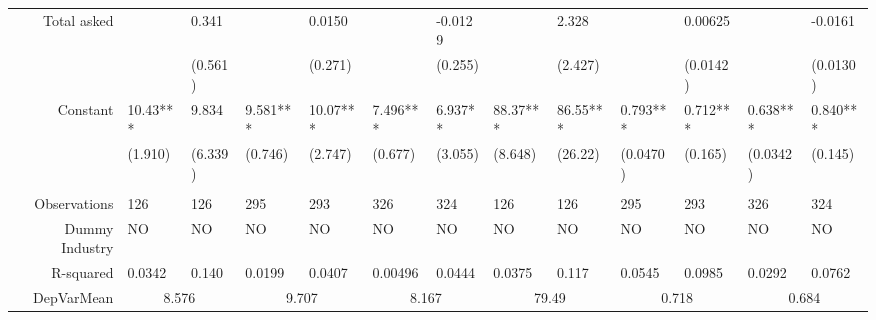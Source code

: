 \begin{tabular}{rrrrrrrrrrrrr}
Total asked & \multicolumn{1}{l}{} & \multicolumn{1}{l}{0.341} & \multicolumn{1}{l}{} & \multicolumn{1}{l}{0.0150} & \multicolumn{1}{l}{} & \multicolumn{1}{l}{-0.0129} & \multicolumn{1}{l}{} & \multicolumn{1}{l}{2.328} & \multicolumn{1}{l}{} & \multicolumn{1}{l}{0.00625} & \multicolumn{1}{l}{} & \multicolumn{1}{l}{-0.0161} \\
      & \multicolumn{1}{l}{} & \multicolumn{1}{l}{(0.561)} & \multicolumn{1}{l}{} & \multicolumn{1}{l}{(0.271)} & \multicolumn{1}{l}{} & \multicolumn{1}{l}{(0.255)} & \multicolumn{1}{l}{} & \multicolumn{1}{l}{(2.427)} & \multicolumn{1}{l}{} & \multicolumn{1}{l}{(0.0142)} & \multicolumn{1}{l}{} & \multicolumn{1}{l}{(0.0130)} \\
Constant & \multicolumn{1}{l}{10.43***} & \multicolumn{1}{l}{9.834} & \multicolumn{1}{l}{9.581***} & \multicolumn{1}{l}{10.07***} & \multicolumn{1}{l}{7.496***} & \multicolumn{1}{l}{6.937**} & \multicolumn{1}{l}{88.37***} & \multicolumn{1}{l}{86.55***} & \multicolumn{1}{l}{0.793***} & \multicolumn{1}{l}{0.712***} & \multicolumn{1}{l}{0.638***} & \multicolumn{1}{l}{0.840***} \\
      & \multicolumn{1}{l}{(1.910)} & \multicolumn{1}{l}{(6.339)} & \multicolumn{1}{l}{(0.746)} & \multicolumn{1}{l}{(2.747)} & \multicolumn{1}{l}{(0.677)} & \multicolumn{1}{l}{(3.055)} & \multicolumn{1}{l}{(8.648)} & \multicolumn{1}{l}{(26.22)} & \multicolumn{1}{l}{(0.0470)} & \multicolumn{1}{l}{(0.165)} & \multicolumn{1}{l}{(0.0342)} & \multicolumn{1}{l}{(0.145)} \\
      & \multicolumn{1}{l}{} & \multicolumn{1}{l}{} & \multicolumn{1}{l}{} & \multicolumn{1}{l}{} & \multicolumn{1}{l}{} & \multicolumn{1}{l}{} & \multicolumn{1}{l}{} & \multicolumn{1}{l}{} & \multicolumn{1}{l}{} & \multicolumn{1}{l}{} & \multicolumn{1}{l}{} & \multicolumn{1}{l}{} \\
      \midrule
Observations & \multicolumn{1}{l}{126} & \multicolumn{1}{l}{126} & \multicolumn{1}{l}{295} & \multicolumn{1}{l}{293} & \multicolumn{1}{l}{326} & \multicolumn{1}{l}{324} & \multicolumn{1}{l}{126} & \multicolumn{1}{l}{126} & \multicolumn{1}{l}{295} & \multicolumn{1}{l}{293} & \multicolumn{1}{l}{326} & \multicolumn{1}{l}{324} \\
Dummy Industry & \multicolumn{1}{l}{NO} & \multicolumn{1}{l}{NO} & \multicolumn{1}{l}{NO} & \multicolumn{1}{l}{NO} & \multicolumn{1}{l}{NO} & \multicolumn{1}{l}{NO} & \multicolumn{1}{l}{NO} & \multicolumn{1}{l}{NO} & \multicolumn{1}{l}{NO} & \multicolumn{1}{l}{NO} & \multicolumn{1}{l}{NO} & \multicolumn{1}{l}{NO} \\
R-squared & \multicolumn{1}{l}{0.0342} & \multicolumn{1}{l}{0.140} & \multicolumn{1}{l}{0.0199} & \multicolumn{1}{l}{0.0407} & \multicolumn{1}{l}{0.00496} & \multicolumn{1}{l}{0.0444} & \multicolumn{1}{l}{0.0375} & \multicolumn{1}{l}{0.117} & \multicolumn{1}{l}{0.0545} & \multicolumn{1}{l}{0.0985} & \multicolumn{1}{l}{0.0292} & \multicolumn{1}{l}{0.0762} \\
DepVarMean & \multicolumn{2}{c}{8.576} & \multicolumn{2}{c}{9.707} & \multicolumn{2}{c}{8.167} & \multicolumn{2}{c}{79.49} & \multicolumn{2}{c}{0.718} & \multicolumn{2}{c}{0.684} \\
\bottomrule
\end{tabular}%
